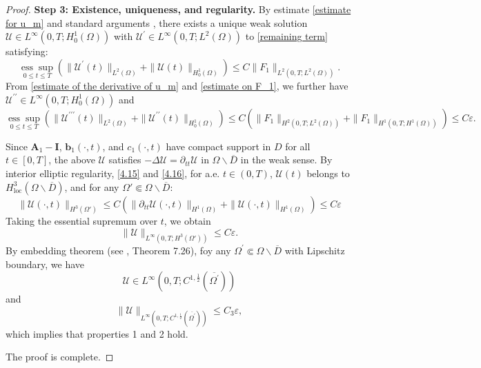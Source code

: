 \documentclass[11pt,reqno,oneside]{amsart}
\numberwithin{equation}{section}
\theoremstyle{definition}
\theoremstyle{remark}
\numberwithin{equation}{section}
\begin{document}
\begin{proof}
		\medskip
		\textbf{Step 3: Existence, uniqueness, and regularity.}  
		By estimate \eqref{estimate for u_m} and standard arguments \cite[Theorems 3–4, pp.407–408]{Evans}, there exists a unique weak solution $\mathcal{U} \in L^\infty(0,T;H^1_0(\Omega))$ with $\mathcal{U}^\prime \in L^\infty(0,T;L^2(\Omega))$ to \eqref{remaining term} satisfying:
		\begin{equation}\label{4.15}
			\underset{0 \leq t \leq T}{\operatorname{ess} \sup}	 \left( \| \mathcal{U}^{\prime}(t) \|_{L^2(\Omega)} + \| \mathcal{U}(t) \|_{H^1_0(\Omega)} \right) \leqslant C \| F_1 \|_{L^2(0,T;L^2(\Omega))}.
		\end{equation}
		From \eqref{estimate of the derivative of u_m} and \eqref{estimate on F_1}, we further have $\mathcal{U}^{\prime \prime} \in L^\infty(0,T;H^1_0(\Omega))$ and 
		\begin{equation}\label{4.16}
			\underset{0 \leq t \leq T}{\operatorname{ess} \sup}
			\left( \| \mathcal{U}^{\prime\prime\prime}(t) \|_{L^2(\Omega)} + \|  \mathcal{U}^{\prime \prime}(t) \|_{H^1_0(\Omega)} \right) 
			\leqslant C \left( \| F_1 \|_{H^2(0,T;L^2(\Omega))} + \| F_1 \|_{H^1(0,T;H^1(\Omega))} \right)\leqslant C\varepsilon.
		\end{equation}
		
		Since $\mathbf{A}_1 - \mathbf{I}$, $\mathbf{b}_1(\cdot,t)$, and $c_1(\cdot,t)$ have compact support in $D$ for all $t \in [0,T]$, the above $\mathcal{U}$ satisfies $-\Delta \mathcal{U} = \partial_{tt}\mathcal{U}$ in $\Omega \backslash \overline{D}$ in the weak sense. By interior elliptic regularity, \eqref{4.15} and \eqref{4.16}, for a.e. $t \in (0,T)$, $\mathcal{U}(t)$ belongs to $H^3_{\mathrm{loc}}(\Omega \backslash \overline{D})$, and for any $\Omega' \Subset \Omega \backslash \overline{D}$:
		\begin{equation*}
			\| \mathcal{U}(\cdot,t) \|_{H^3(\Omega')} \leqslant C \left( \| \partial_{tt} \mathcal{U}(\cdot,t) \|_{H^1(\Omega)} + \| \mathcal{U}(\cdot,t) \|_{H^1(\Omega)} \right) \leqslant C \varepsilon  
		\end{equation*}
		Taking the essential supremum over $t$, we obtain
		\begin{equation*}
			\| \mathcal{U} \|_{L^\infty(0,T;H^3(\Omega'))} \leqslant C \varepsilon.
		\end{equation*}
		By embedding theorem (see \cite{GilbargTrudinger}, Theorem 7.26), foy any $\Omega^\prime \Subset \Omega\backslash \overline{D}$ with Lipschitz boundary, we have
		\begin{equation*}
			\mathcal{U} \in L^\infty(0,T;C^{1,\frac{1}{2}}(\overline{\Omega^\prime}))
		\end{equation*} 
		and 
		\begin{equation*}
			\| \mathcal{U} \|_{L^\infty(0,T;C^{1,\frac{1}{2}}(\overline{\Omega^\prime}))} \leqslant C_3 \varepsilon,
		\end{equation*}
		which implies that properties 1 and 2 hold.
		
		The proof is complete.
	\end{proof}
	
\end{document}
